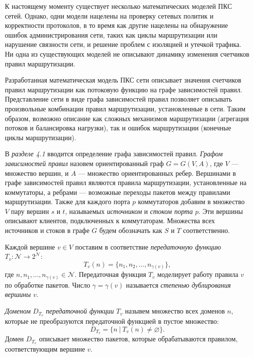 \documentclass[14pt,autoref,href]{disser}
\theoremstyle{definition}
\begin{document}
К настоящему моменту существует несколько математических моделей ПКС сетей.
Однако, одни модели нацелены на проверку сетевых политик и корректности протоколов, в то время как другие нацелены на обнаружение ошибок администрирования сети, таких как циклы маршрутизации или нарушение связности сети, и решение проблем с изоляцией и утечкой трафика.
Ни одна из существующих моделей не описывают динамику изменения счетчиков правил маршрутизации.

Разработанная математическая модель ПКС сети описывает значения счетчиков правил маршрутизации как потоковую функцию на графе зависимостей правил.
Представление сети в виде графа зависимостей правил позволяет описывать произвольные комбинации правил маршрутизации, установленные в сети.
Таким образом, возможно описание как сложных механизмов маршрутизации (агрегация потоков и балансировка нагрузки), так и ошибок маршрутизации (конечные циклы маршрутизации).

В \emph{разделе 4.1} вводится определение графа зависимостей правил. \textit{Графом зависимостей правил} назовем ориентированный граф $G=G(V,A)$, где $V$ --- множество вершин, и $A$ --- множество ориентированных ребер. Вершинами в графе зависимостей правил являются правила маршрутизации, установленные на коммутаторы, а ребрами --- возможные переходы пакетов между правилами маршрутизации.
Также для каждого порта $p$ коммутаторов добавим в множество $V$ пару вершин $s$ и $t$, называемых \textit{источником} и \textit{стоком порта} $p$.
Эти вершины описывают клиентов, подключенных к коммутаторам.
Множества всех источников и стоков в графе $G$ будем обозначать как $S$ и $T$ соответственно.

Каждой вершине $v\in V$ поставим в соответствие \textit{передаточную функцию} $T_v:\mathcal{N} \rightarrow 2^{\mathcal{N}}$:
\begin{equation} \label{eq:transfer}
    T_v(n) = \big\{ n_1,n_2,\dots,n_{\gamma(v)} \big\},
\end{equation}
где $n,n_1,\dots,n_{\gamma(v)}\in \mathcal{N}$.
Передаточная функция $T_v$ моделирует работу правила $v$ по обработке пакетов.
Число $\gamma=\gamma(v)$ называется \textit{степенью дублирования вершины $v$}.

\textit{Доменом} $D_{T_v}$ \textit{передаточной функции} $T_v$ назывем множество всех доменов $n$, которые не преобразуются передаточной функцией в пустое множество:
\begin{equation} \label{eq:transfer_domain}
    D_{T_v}
    =
    \big\{ n\ |\ T_v(n)\neq \varnothing \big\}.
\end{equation}
Домен $D_{T_v}$ описывает множество пакетов, которые обрабатываются правилом, соответствующим вершине $v$.
\end{document}
